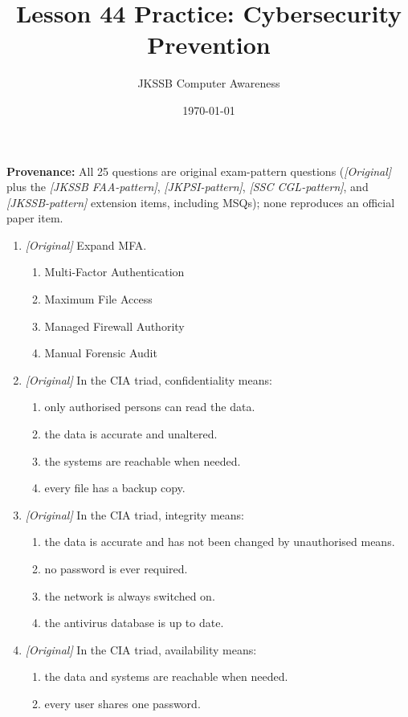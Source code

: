 \documentclass[11pt]{article}
\title{Lesson 44 Practice: Cybersecurity Prevention}
\author{JKSSB Computer Awareness}
\date{\today}
\begin{document}
\maketitle
\noindent\textbf{Provenance:} All 25 questions are original exam-pattern questions (\textit{[Original]} plus the \textit{[JKSSB FAA-pattern]}, \textit{[JKPSI-pattern]}, \textit{[SSC CGL-pattern]}, and \textit{[JKSSB-pattern]} extension items, including MSQs); none reproduces an official paper item.

\begin{enumerate}[label=\textbf{Q\arabic*.}, leftmargin=*]
\item \textit{[Original]} Expand MFA.
  \begin{enumerate}[label=\Alph*.]
    \item Multi-Factor Authentication
    \item Maximum File Access
    \item Managed Firewall Authority
    \item Manual Forensic Audit
  \end{enumerate}
\item \textit{[Original]} In the CIA triad, confidentiality means:
  \begin{enumerate}[label=\Alph*.]
    \item only authorised persons can read the data.
    \item the data is accurate and unaltered.
    \item the systems are reachable when needed.
    \item every file has a backup copy.
  \end{enumerate}
\item \textit{[Original]} In the CIA triad, integrity means:
  \begin{enumerate}[label=\Alph*.]
    \item the data is accurate and has not been changed by unauthorised means.
    \item no password is ever required.
    \item the network is always switched on.
    \item the antivirus database is up to date.
  \end{enumerate}
\item \textit{[Original]} In the CIA triad, availability means:
  \begin{enumerate}[label=\Alph*.]
    \item the data and systems are reachable when needed.
    \item every user shares one password.

\end{enumerate}
\end{enumerate}
\end{document}

